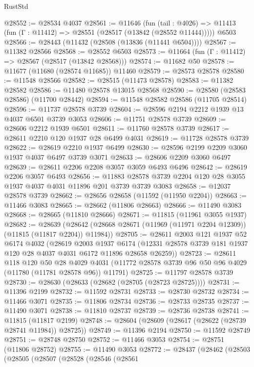 \begin{lexlean}{RustStd}
\begin{coremodule}
@28552 := @28534 @4037
@28561 := @11646
    (fun (tail : @4026) => @11413 (fun (Γ : @11412) => @28551 (@28517 (@13842 (@28552 @11444)))))
    @6503
@28566 := @28443 (@11432 (@28508 (@13836 (@11441 @6504))))
@28567 := @11382 @28566
@28568 := @28552 @6503
@28573 := @11664 (fun (Γ : @11412) => @28567 (@28517 (@13842 @28568)))
@28574 := @11682 @50
@28578 := @11677 (@11680 (@28574 @11685)) @11460
@28579 := @28573 @28578
@28580 := @11548 @28566
@28582 := @28515 (@11473 @28578)
@28583 := @11382 @28582
@28586 := @11480 @28578 @13015 @28568
@28590 := @28580 (@28583 @28586) (@11700 @28442)
@28594 := @11548 @28582 @28586 (@11705 @28514)
@28596 := @11737 @28578 @3739
@28604 := @28596 @2194 @2212 @1939 @13 @4037 @6501 @3739 @3053
@28606 := @11751 @28578 @3739
@28609 := @28606 @2212 @1939 @6501
@28611 := @11760 @28578 @3739
@28617 := @28611 @2210 @120 @1937 @28 @6499 @4031
@28619 := @11728 @28578 @3739
@28622 := @28619 @2210 @1937 @6499
@28630 := @28596 @2199 @2209 @3060 @1937 @4037 @6497 @3739 @3071
@28633 := @28606 @2209 @3060 @6497
@28639 := @28611 @2206 @2208 @3057 @3059 @6493 @6496
@28642 := @28619 @2206 @3057 @6493
@28656 := @11883 @28578 @3739 @2204 @120 @28 @3055 @1937 @4037 @4031 @11896 @201 @3739 @3739 @3083
@28658 := @12037 @28578 @3739
@28662 := @28656 @28658 (@11592 (@11950 @2204))
@28663 := @11466 @3083
@28665 := @28662 (@11806 @28663)
@28666 := @11490 @3083
@28668 := @28665 (@11810 @28666)
@28671 := @11815 (@11961 @3055 @1937)
@28682 := @28639
    (@28642 (@28668 @28671 (@11969 (@11971 @2204 @12309)) (@11815 (@11817 @2204)) @11984))
@28705 := @28611
    @2003
    @121
    @1937
    @52
    @6174
    @4032
    (@28619
      @2003
      @1937
      @6174
      (@12331 @28578 @3739 @181 @1937 @120 @28 @4037 @4031 @6172 @11896 @28658 @26259))
@28723 := @28611
    @118
    @120
    @50
    @28
    @4029
    @4031
    (@11772 @28578 @3739 @96 @50 @96 @4029 (@11780 (@11781 @28578 @96)) @11791)
@28725 := @11797 @28578 @3739
@28730 := @28630 (@28633 (@28682 (@28705 (@28723 @28725))))
@28731 := @11396 @2199
@28732 := @11592 @28731
@28733 := @28730 @28732
@28734 := @11466 @3071
@28735 := @11806 @28734
@28736 := @28733 @28735
@28737 := @11490 @3071
@28738 := @11810 @28737
@28739 := @28736 @28738
@28741 := @11815 (@11817 @2199)
@28748 := @28604 (@28609 (@28617 (@28622 (@28739 @28741 @11984)) @28725))
@28749 := @11396 @2194
@28750 := @11592 @28749
@28751 := @28748 @28750
@28752 := @11466 @3053
@28754 := @28751 (@11806 @28752)
@28755 := @11490 @3053
@28772 := @28437
    (@28462
      (@28503
        (@28505
          (@28507
            (@28528
              (@28546
                (@28561

\end{coremodule}
\end{lexlean}
